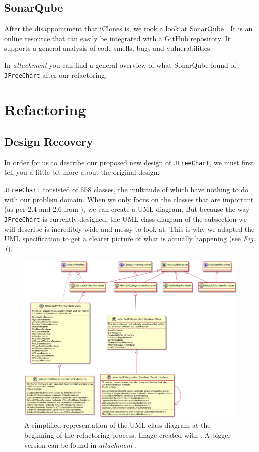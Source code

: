 \documentclass[11pt]{article}
\begin{document}
	\subsection{SonarQube}
	After the disappointment that \textsf{iClones} is, we took a look at \textsf{SonarQube} \cite{sonarqube}. It is an online resource that can easily be integrated with a \textsf{GitHub} repository. It supports a general analysis of code smells, bugs and vulnerabilities.
	
	In \textsl{attachment \pageref{sonarcloud}} you can find a general overview of what \textsf{SonarQube} found of \texttt{JFreeChart} after our refactoring.
	
	
	\section{Refactoring}
	\subsection{Design Recovery}
	In order for us to describe our proposed new design of \texttt{JFreeChart}, we must first tell you a little bit more about the original design.
	
	\texttt{JFreeChart} consisted of 658 classes, the multitude of which have nothing to do with our problem domain. When we only focus on the classes that are important (as per 2.4 and 2.6 from \cite{demeyer2009object}), we can create a UML diagram. But because the way \texttt{JFreeChart} is currently designed, the UML class diagram of the subsection we will describe is incredibly wide and messy to look at. This is why we adapted the UML specification to get a clearer picture of what is actually happening (see \textsl{Fig.\,\ref{fig:UML-start}}).
	
	\begin{figure}[H]
		\centering
		\includegraphics[width=\textwidth]{pictures/class-diagram-begin.pdf}
		\caption{A simplified representation of the UML class diagram at the beginning of the refactoring process. Image created with \cite{plantuml}. A bigger version can be found in \textsl{attachment \pageref{class-diagram-begin}}.}
		\label{fig:UML-start}
	\end{figure}
	
\end{document}
